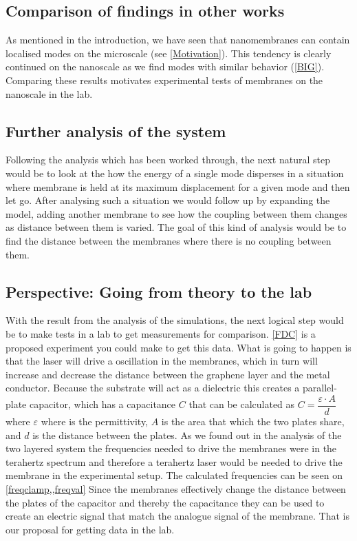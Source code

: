 \subsection{Comparison of findings in other works}
As mentioned in the introduction, we have seen that nanomembranes can contain localised modes on the microscale (see \cref{Motivation}\cite{Davidovikj2016}). This tendency is clearly continued on the nanoscale as we find modes with similar behavior (\cref{BIG}). Comparing these results motivates experimental tests of membranes on the nanoscale in the lab.

\subsection{Further analysis of the system}
Following the analysis which has been worked through, the next natural step would be to look at the how the energy of a single mode disperses in a situation where membrane is held at its maximum displacement for a given mode and then let go. After analysing such a situation we would follow up by expanding the model, adding another membrane to see how the coupling between them changes as distance between them is varied. The goal of this kind of analysis would be to find the distance between the membranes where there is no coupling between them.

\subsection{Perspective: Going from theory to the lab}
With the result from the analysis of the simulations, the next logical step would be to make tests in a lab to get measurements for comparison. \cref{FDC} is a proposed experiment you could make to get this data. What is going to happen is that the laser will drive a oscillation in the membranes, which in turn will increase and decrease the distance between the graphene layer and the metal conductor. Because the substrate will act as a dielectric this creates a parallel-plate capacitor, which has a capacitance $C$ that can be calculated as $C=\dfrac{\varepsilon\cdot A}{d}$ where $\varepsilon$ where is the permittivity, $A$ is the area that which the two plates share, and $d$ is the distance between the plates. As we found out in the analysis of the two layered system the frequencies needed to drive the membranes were in the terahertz spectrum and therefore a terahertz laser would be needed to drive the membrane in the experimental setup. The calculated frequencies can be seen on \cref{freqclamp,,freqval} Since the membranes effectively change the distance between the plates of the capacitor and thereby the capacitance they can be used to create an electric signal that match the analogue signal of the membrane. That is our proposal for getting data in the lab.

